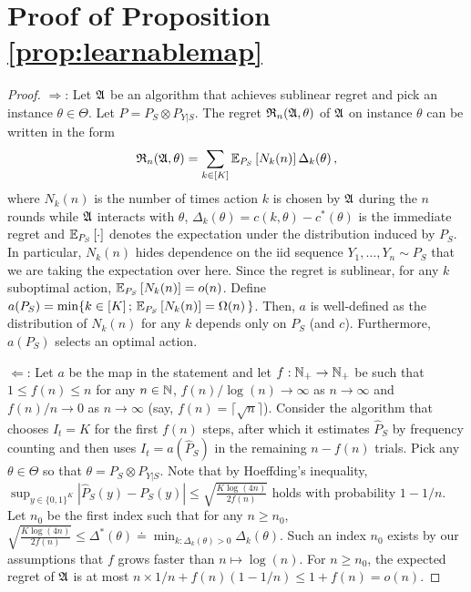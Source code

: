 \section*{Proof of Proposition \ref{prop:learnablemap}}
\begin{proof}
	$\Rightarrow$: Let $\mathfrak{A}$ be an algorithm that achieves sublinear regret
	and pick  an instance  $\theta \in\Theta$. Let $P = P_S \otimes P_{Y|S}$.
	The regret $\mathfrak{R}_n(\mathfrak{A},\theta)$ of $\mathfrak{A}$ on instance $\theta$ can be written in the form
	\begin{align*}
	\mathfrak{R}_n(\mathfrak{A},\theta) = \sum_{k\in [K]} \mathbb{E}_{P_S}\left[N_k(n)\right] \Delta_k(\theta)\,,
	\end{align*}
	where $N_k(n)$ is the number of times action $k$ is chosen by $\mathfrak{A}$ during the $n$ rounds while
	$\mathfrak{A}$ interacts with $\theta$, $\Delta_k(\theta) = c(k,\theta) - c^*(\theta)$ is the immediate regret
	and $\mathbb{E}_{P_S}\left[\cdot\right]$ denotes the expectation under the distribution induced by $P_S$.
	In particular, $N_k(n)$ hides dependence on the iid sequence $Y_1,\dots,Y_n \sim P_S$ 
	that we are taking the expectation over here. 
	Since the regret is sublinear, for any $k$ suboptimal action, $\mathbb{E}_{P_S}\left[N_k(n)\right] = o(n)$. 
	Define $a(P_S) = \min \{ k\in [K]\,;\, \mathbb{E}_{P_S}\left[N_k(n)\right] = \Omega(n) \,\}$. Then, $a$ is well-defined as the distribution of $N_k(n)$ for any $k$ depends only on $P_S$ (and $c$). Furthermore, $a(P_S)$ selects an optimal action.
	
	$\Leftarrow$: Let $a$ be the map in the statement and let $f:\mathbb{N}_+\to\mathbb{N}_+$ be such that $1\le f(n)\le n$ for any  $n\in \mathbb{N}$,
	$f(n)/\log(n) \to \infty$ as $n\to \infty$ and $f(n)/n \to 0$ as $n\to \infty$ (say, $f(n) = \lceil \sqrt{n} \rceil$).
	Consider the algorithm that chooses $I_t = K$ for the first $f(n)$ steps, after which it estimates $\hat{P}_S$ by
	frequency counting and then uses $I_t = a(\hat{P}_S)$ in the remaining $n-f(n)$ trials. 
	Pick any $\theta \in \Theta$ so that $\theta = P_S \otimes P_{Y|S}$. 
	Note that by Hoeffding's inequality, 
	$\sup_{y\in \{0,1\}^K} |\hat{P}_S(y)  - P_S(y)| \le \sqrt{\frac{K\log(4n)}{2f(n)}}$ holds with probability $1-1/n$.
	Let $n_0$ be the first index such that for any $n\ge n_0$,
	$\sqrt{\frac{K\log(4n)}{2f(n)}}\le \Delta^*(\theta) \doteq \min_{k:\Delta_k(\theta)>0} \Delta_k(\theta)$.
	Such an index $n_0$ exists by our assumptions that $f$ grows faster than $n \mapsto \log(n)$.
	For $n\ge n_0$, the expected regret of $\mathfrak{A}$ is at most $n \times 1/n + f(n) (1-1/n) \le 1+f(n) = o(n)$.
	\end{proof}


